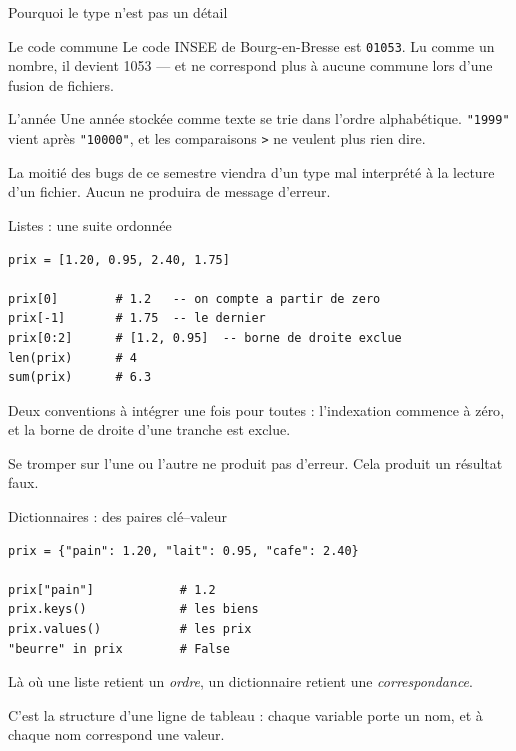 \documentclass[10pt,aspectratio=169]{beamer}
\begin{document}
\begin{frame}{Pourquoi le type n'est pas un détail}
\begin{block}{Le code commune}
Le code INSEE de Bourg-en-Bresse est \texttt{01053}. Lu comme un nombre, il devient 1053 --- et ne correspond plus à aucune commune lors d'une fusion de fichiers.
\end{block}

\vspace{0.8em}
\begin{block}{L'année}
Une année stockée comme texte se trie dans l'ordre alphabétique. \texttt{"1999"} vient après \texttt{"10000"}, et les comparaisons \texttt{>} ne veulent plus rien dire.
\end{block}

\vspace{1.2em}
La moitié des bugs de ce semestre viendra d'un type mal interprété à la lecture d'un fichier. Aucun ne produira de message d'erreur.
\end{frame}

\begin{frame}[fragile]{Listes : une suite ordonnée}
\begin{lstlisting}
prix = [1.20, 0.95, 2.40, 1.75]

prix[0]        # 1.2   -- on compte a partir de zero
prix[-1]       # 1.75  -- le dernier
prix[0:2]      # [1.2, 0.95]  -- borne de droite exclue
len(prix)      # 4
sum(prix)      # 6.3
\end{lstlisting}

\vspace{1em}
Deux conventions à intégrer une fois pour toutes : l'indexation commence à \alert{zéro}, et la borne de droite d'une tranche est \alert{exclue}.

\vspace{0.6em}
Se tromper sur l'une ou l'autre ne produit pas d'erreur. Cela produit un résultat faux.
\end{frame}

\begin{frame}[fragile]{Dictionnaires : des paires clé--valeur}
\begin{lstlisting}
prix = {"pain": 1.20, "lait": 0.95, "cafe": 2.40}

prix["pain"]            # 1.2
prix.keys()             # les biens
prix.values()           # les prix
"beurre" in prix        # False
\end{lstlisting}

\vspace{1.2em}
Là où une liste retient un \emph{ordre}, un dictionnaire retient une \emph{correspondance}.

\vspace{0.8em}
C'est la structure d'une ligne de tableau : chaque variable porte un nom, et à chaque nom correspond une valeur.
\end{frame}
\end{document}
